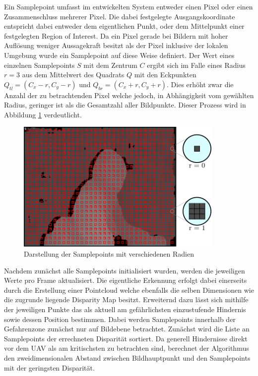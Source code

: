 \noindent
Ein Samplepoint umfasst im entwickelten System entweder einen Pixel oder einen Zusammenschluss mehrerer Pixel. Die dabei festgelegte Ausgangskoordinate entspricht dabei entweder dem eigentlichen Punkt, oder dem Mittelpunkt einer festgelegten Region of Interest. Da ein Pixel gerade bei Bildern mit hoher Auflösung weniger Aussagekraft besitzt als der Pixel inklusive der lokalen Umgebung wurde ein Samplepoint auf diese Weise definiert. Der Wert eines einzelnen Samplepoints $S$ mit dem Zentrum $C$ ergibt sich im Falle eines Radius $r=3$ aus dem Mittelwert des Quadrats $Q$ mit den Eckpunkten $Q_{tl} = (C_x - r, C_y -r)$ und $Q_{br} = (C_x + r, C_y +r)$. Dies erhöht zwar die Anzahl der zu betrachtenden Pixel welche jedoch, in Abhängigkeit vom gewählten Radius, geringer ist als die Gesamtzahl aller Bildpunkte. Dieser Prozess wird in Abbildung \ref{fig:samplepoints_initmodes} verdeutlicht.\\

\begin{figure}[h]
	\begin{center}
		\includegraphics[width=10cm]{img/samplepoints_initmodes.pdf}
	\end{center}
	\caption{Darstellung der Samplepoints mit verschiedenen Radien}
	\label{fig:samplepoints_initmodes}
\end{figure}

\noindent
Nachdem zunächst alle Samplepoints initialisiert wurden, werden die jeweiligen Werte pro Frame aktualisiert. Die eigentliche Erkennung erfolgt dabei einerseits durch die Erstellung einer Pointcloud welche ebenfalls die selben Dimensionen wie die zugrunde liegende Disparity Map besitzt. Erweiternd dazu lässt sich mithilfe der jeweiligen Punkte das als aktuell am gefährlichsten einzustufende Hindernis sowie dessen Position bestimmen. Dabei werden Samplepoints innerhalb der Gefahrenzone zunächst nur auf Bildebene betrachtet.
Zunächst wird die Liste an Samplepoints der errechneten Disparität sortiert.
Da generell Hindernisse direkt vor dem UAV als am kritischsten zu betrachten sind, berechnet der Algorithmus den zweidimensionalen Abstand zwischen Bildhauptpunkt und den Samplepoints mit der geringsten Disparität. 
